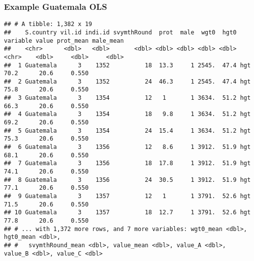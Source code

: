 \documentclass[
]{book}
\newenvironment{Shaded}{\begin{snugshade}}{\end{snugshade}}
\newcommand{\DataTypeTok}[1]{\textcolor[rgb]{0.13,0.29,0.53}{#1}}
\newcommand{\DecValTok}[1]{\textcolor[rgb]{0.00,0.00,0.81}{#1}}
\newcommand{\KeywordTok}[1]{\textcolor[rgb]{0.13,0.29,0.53}{\textbf{#1}}}
\newcommand{\NormalTok}[1]{#1}
\newcommand{\OperatorTok}[1]{\textcolor[rgb]{0.81,0.36,0.00}{\textbf{#1}}}
\newcommand{\OtherTok}[1]{\textcolor[rgb]{0.56,0.35,0.01}{#1}}
\newcommand{\StringTok}[1]{\textcolor[rgb]{0.31,0.60,0.02}{#1}}
\begin{document}
\hypertarget{example-guatemala-ols}{%
\subsubsection{Example Guatemala OLS}\label{example-guatemala-ols}}

\begin{Shaded}
\end{Shaded}

\begin{verbatim}
## # A tibble: 1,382 x 19
##    S.country vil.id indi.id svymthRound  prot  male  wgt0  hgt0 variable value prot_mean male_mean
##    <chr>      <dbl>   <dbl>       <dbl> <dbl> <dbl> <dbl> <dbl> <chr>    <dbl>     <dbl>     <dbl>
##  1 Guatemala      3    1352          18  13.3     1 2545.  47.4 hgt       70.2      20.6     0.550
##  2 Guatemala      3    1352          24  46.3     1 2545.  47.4 hgt       75.8      20.6     0.550
##  3 Guatemala      3    1354          12   1       1 3634.  51.2 hgt       66.3      20.6     0.550
##  4 Guatemala      3    1354          18   9.8     1 3634.  51.2 hgt       69.2      20.6     0.550
##  5 Guatemala      3    1354          24  15.4     1 3634.  51.2 hgt       75.3      20.6     0.550
##  6 Guatemala      3    1356          12   8.6     1 3912.  51.9 hgt       68.1      20.6     0.550
##  7 Guatemala      3    1356          18  17.8     1 3912.  51.9 hgt       74.1      20.6     0.550
##  8 Guatemala      3    1356          24  30.5     1 3912.  51.9 hgt       77.1      20.6     0.550
##  9 Guatemala      3    1357          12   1       1 3791.  52.6 hgt       71.5      20.6     0.550
## 10 Guatemala      3    1357          18  12.7     1 3791.  52.6 hgt       77.8      20.6     0.550
## # ... with 1,372 more rows, and 7 more variables: wgt0_mean <dbl>, hgt0_mean <dbl>,
## #   svymthRound_mean <dbl>, value_mean <dbl>, value_A <dbl>, value_B <dbl>, value_C <dbl>
\end{verbatim}
\end{document}
